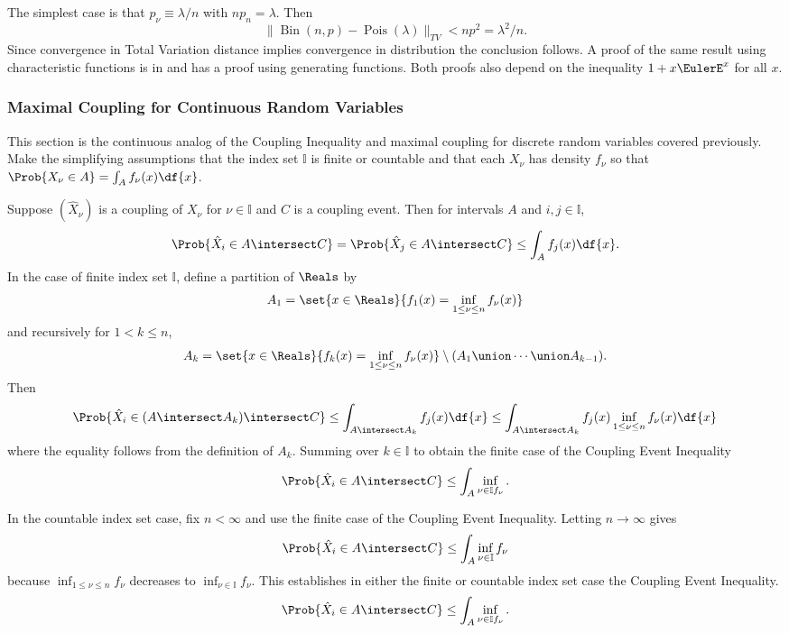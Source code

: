 \documentclass[12pt]{article}
\begin{document}
\begin{example}
    The simplest case is that \( p_\nu \equiv \lambda/n \) with \( np_{n}
    = \lambda \).  Then
    \[
        \|
        \operatorname{Bin}
        (n,p) -
        \operatorname{Pois}
        (\lambda) \|_{TV} < np^2 = \lambda^2/n.
    \] Since convergence in Total Variation distance implies convergence
    in distribution the conclusion follows.  A proof of the same result
    using characteristic functions is in
    \cite[Section 9.4]{breiman92} and
    \cite[Section XI.6]{feller73} has a proof using generating
    functions.  Both proofs also depend on the inequality \( 1 + x
    \EulerE^x \) for all \( x \).

\end{example}

\subsubsection*{Maximal Coupling for Continuous Random Variables}

This section is the continuous analog of the Coupling Inequality and
maximal coupling for discrete random variables covered previously.  Make
the simplifying assumptions that the index set \( \mathbb{I} \) is
finite or countable and that each \( X_{\nu} \) has density \( f_{\nu} \)
so that \( \Prob{X_{\nu} \in A} = \int_A f_{\nu}(x) \df{x} \).

Suppose \( (\hat{X}_{\nu}) \) is a coupling of \( X_{\nu} \) for \( \nu
\in \mathbb{I} \) and \( C \) is a coupling event.  Then for intervals \(
A \) and \( i,j \in \mathbb{I} \),
\[
    \Prob{\hat{X}_{i} \in A \intersect C} = \Prob{\hat{X}_{j} \in A
    \intersect C} \le \int_A f_{j}(x) \df{x}.
\] In the case of finite index set \( \mathbb{I} \), define a partition
of \( \Reals \) by
\[
    A_1 = \set{x \in \Reals}{f_1(x) = \inf_{1 \le \nu \le n} f_\nu(x)}
\] and recursively for \( 1 < k \le n \),
\[
    A_k = \set{x \in \Reals}{f_k(x) = \inf_{{1 \le \nu \le n}} f_\nu(x)}
    \setminus (A_1 \union \cdots \union A_{k-1}).
\] Then
\[
    \Prob{\hat{X}_{i} \in (A \intersect A_{k})\intersect C} \le \int_{A
    \intersect A_k} f_{j}(x) \df{x} \le \int_{A \intersect A_k} f_{j}(x)
    \inf_{1 \le \nu \le n} f_\nu(x) \df{x}
\] where the equality follows from the definition of \( A_k \).  Summing
over \( k \in \mathbb{I} \) to obtain the finite case of the Coupling
Event Inequality%
\[
    \Prob{\hat{X}_{i} \in A \intersect C} \le \int_A \inf_{\nu \in
    \mathbb{I} f_{\nu}}.
\]

In the countable index set case, fix \( n < \infty \) and use the finite
case of the Coupling Event Inequality.  Letting \( n \to \infty \) gives
\[
    \Prob{\hat{X}_{i} \in A \intersect C} \le \int_A \inf_{\nu \in
    \mathbb{I}} f_{\nu}
\] because \( \inf_{1 \le \nu \le n} f_{\nu} \) decreases to \( \inf_{\nu
\in \mathbb{I}} f_{\nu} \).  This establishes in either the finite or
countable index set case the Coupling Event Inequality.%
\[
    \Prob{\hat{X}_{i} \in A \intersect C} \le \int_A \inf_{\nu \in
    \mathbb{I} f_{\nu}}.
\]
\end{document}

